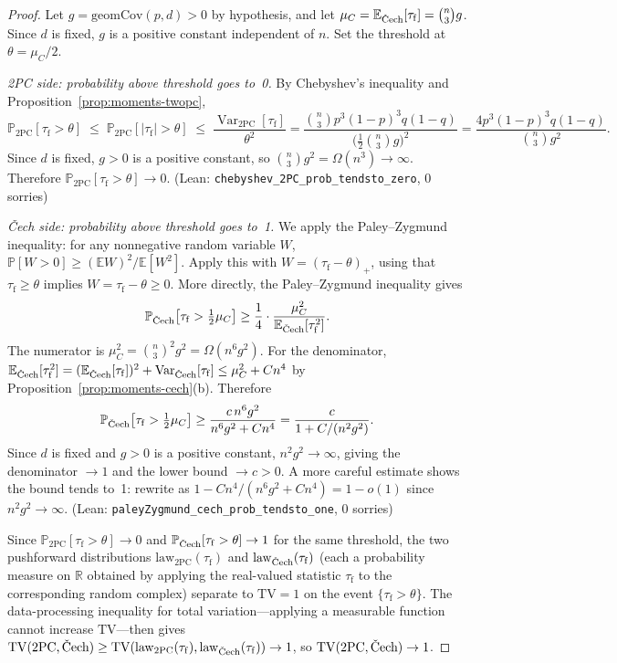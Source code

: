 \documentclass[reqno,12pt]{amsart}
\newcommand{\tauf}{\tau_{\mathrm{f}}}
\newcommand{\PC}{\mathrm{2PC}}
\newcommand{\Cech}{\ifmmode\text{\v{C}ech}\else\v{C}ech\fi}  %
\newcommand{\TV}{\mathrm{TV}}
\newcommand{\geomCov}{\mathrm{geomCov}}
\newcommand{\RR}{\mathbb{R}}
\newcommand{\EE}{\mathbb{E}}
\newcommand{\PP}{\mathbb{P}}
\DeclareMathOperator{\Var}{Var}
\newcommand{\leanverified}[1]{\textup{(Lean: \texttt{#1}, 0 sorries)}}
\theoremstyle{plain}
\theoremstyle{definition}
\theoremstyle{remark}
\begin{document}
\begin{proof}
Let $g = \geomCov(p,d) > 0$ by hypothesis, and let $\mu_C = \EE_{\Cech}[\tauf] = \binom{n}{3}g$.
Since $d$ is fixed, $g$ is a positive constant independent of $n$.
Set the threshold at $\theta = \mu_C/2$.

\textit{2PC side: probability above threshold goes to~0.}
By Chebyshev's inequality and Proposition~\ref{prop:moments-twopc},
\[
  \PP_{\PC}\!\left[\tauf > \theta\right]
  \;\leq\; \PP_{\PC}\!\left[|\tauf| > \theta\right]
  \;\leq\; \frac{\Var_{\PC}[\tauf]}{\theta^2}
  = \frac{\binom{n}{3}p^3(1-p)^3 q(1-q)}{\bigl(\frac{1}{2}\binom{n}{3}g\bigr)^2}
  = \frac{4p^3(1-p)^3 q(1-q)}{\binom{n}{3}g^2}.
\]
Since $d$ is fixed, $g>0$ is a positive constant, so $\binom{n}{3}g^2 = \Omega(n^3)\to\infty$.
Therefore $\PP_{\PC}[\tauf > \theta] \to 0$.
\hfill \leanverified{chebyshev\_2PC\_prob\_tendsto\_zero}

\textit{\v{C}ech side: probability above threshold goes to~1.}
We apply the Paley--Zygmund inequality: for any nonnegative random variable $W$,
$\PP[W > 0] \geq (\EE W)^2/\EE[W^2]$. Apply this with $W = (\tauf - \theta)_+$, using
that $\tauf \geq \theta$ implies $W = \tauf - \theta \geq 0$. More directly, the
Paley--Zygmund inequality gives
\[
  \PP_{\Cech}\!\left[\tauf > \tfrac{1}{2}\mu_C\right]
  \geq \frac{1}{4}\cdot\frac{\mu_C^2}{\EE_{\Cech}[\tauf^2]}.
\]
The numerator is $\mu_C^2 = \binom{n}{3}^2 g^2 = \Omega(n^6 g^2)$. For the denominator,
$\EE_{\Cech}[\tauf^2] = (\EE_{\Cech}[\tauf])^2 + \Var_{\Cech}[\tauf] \leq \mu_C^2 + Cn^4$
by Proposition~\ref{prop:moments-cech}(b). Therefore
\[
  \PP_{\Cech}\!\left[\tauf > \tfrac{1}{2}\mu_C\right]
  \geq \frac{c\,n^6 g^2}{n^6 g^2 + C n^4}
  = \frac{c}{1 + C/(n^2 g^2)}.
\]
Since $d$ is fixed and $g>0$ is a positive constant, $n^2g^2\to\infty$, giving the
denominator $\to 1$ and the lower bound $\to c > 0$. A more careful estimate shows the
bound tends to~1: rewrite as $1 - Cn^4/(n^6g^2+Cn^4) = 1 - o(1)$ since $n^2g^2\to\infty$.
\hfill \leanverified{paleyZygmund\_cech\_prob\_tendsto\_one}

Since $\PP_{\PC}[\tauf > \theta]\to 0$ and $\PP_{\Cech}[\tauf > \theta]\to 1$ for the same
threshold, the two pushforward distributions
$\mathrm{law}_{\PC}(\tauf)$ and $\mathrm{law}_{\Cech}(\tauf)$ (each a probability measure
on $\RR$ obtained by applying the real-valued statistic $\tauf$ to the corresponding
random complex) separate to $\TV = 1$ on the event $\{\tauf > \theta\}$. The
data-processing inequality for total variation---applying a measurable function cannot
increase $\TV$---then gives
$\TV(\PC,\Cech) \geq \TV(\mathrm{law}_{\PC}(\tauf), \mathrm{law}_{\Cech}(\tauf))\to 1$, so
$\TV(\PC,\Cech)\to 1$.
\end{proof}
\end{document}

